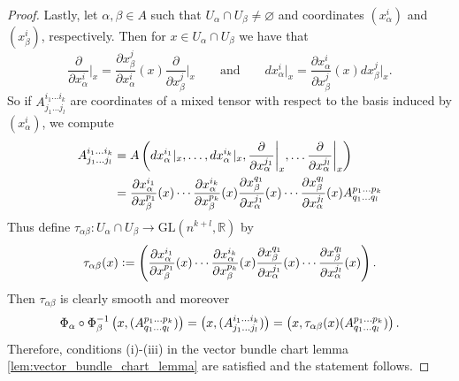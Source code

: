 \begin{proof}
	Lastly, let $\alpha, \beta \in A$ such that $U_\alpha \cap U_\beta \neq \varnothing$ and coordinates $(x^i_\alpha)$ and $(x^i_\beta)$, respectively. Then for $x \in U_\alpha \cap U_\beta$ we have that
	\begin{equation*}
		\frac{\partial}{\partial x_\alpha^i}\bigg\vert_x = \frac{\partial x^j_\beta}{\partial x_\alpha^i}(x)\frac{\partial}{\partial x_\beta^j}\bigg\vert_x \qquad \text{and} \qquad dx_\alpha^i\vert_x = \frac{\partial x_\alpha^i}{\partial x_\beta^j}(x)dx^j_\beta\vert_x.
	\end{equation*}
	So if $A^{i_1\dots i_k}_{j_1\dots j_l}$ are coordinates of a mixed tensor with respect to the basis induced by $(x^i_\alpha)$, we compute
	\begin{align*}
		A^{i_1\dots i_k}_{j_1\dots j_l} &= A\del[3]{dx_\alpha^{i_1}\vert_x,\dots,dx_\alpha^{i_k}\vert_x,\frac{\partial}{\partial x_\alpha^{j_1}}\bigg\vert_x,\dots\frac{\partial}{\partial x_\alpha^{j_l}}\bigg\vert_x}\\
		&= \frac{\partial x_\alpha^{i_1}}{\partial x^{p_1}_\beta}(x)\cdots\frac{\partial x_\alpha^{i_k}}{\partial x_\beta^{p_k}}(x)\frac{\partial x^{q_1}_\beta}{\partial x_\alpha^{j_1}}(x) \cdots \frac{\partial x^{q_l}_\beta}{\partial x_\alpha^{j_l}}(x)A^{p_1\dots p_k}_{q_1\dots q_l}
	\end{align*}
	Thus define $\tau_{\alpha\beta}: U_\alpha \cap U_\beta \to \mathrm{GL}(n^{k + l},\mathbb{R})$ by
	\begin{equation*}
		\tau_{\alpha\beta}(x) := \del[4]{\frac{\partial x_\alpha^{i_1}}{\partial x^{p_1}_\beta}(x)\cdots\frac{\partial x_\alpha^{i_k}}{\partial x_\beta^{p_k}}(x)\frac{\partial x^{q_1}_\beta}{\partial x_\alpha^{j_1}}(x) \cdots \frac{\partial x^{q_l}_\beta}{\partial x_\alpha^{j_l}}(x)}.
	\end{equation*}
	Then $\tau_{\alpha\beta}$ is clearly smooth and moreover
	\begin{equation*}
		\Phi_\alpha \circ \Phi_\beta^{-1}\del[1]{x,(A^{p_1\dots p_k}_{q_1\dots q_l})} = \del[1]{x, (A^{i_1\dots i_k}_{j_1\dots j_l})} = \del[1]{x,\tau_{\alpha\beta}(x)(A^{p_1\dots p_k}_{q_1\dots q_l})}. 
	\end{equation*}
	Therefore, conditions (i)-(iii) in the vector bundle chart lemma \ref{lem:vector_bundle_chart_lemma} are satisfied and the statement follows.
\end{proof}


